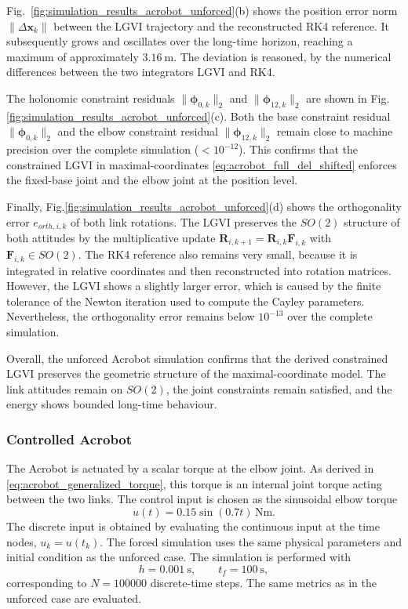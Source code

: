 Fig.~\ref{fig:simulation_results_acrobot_unforced}(b) shows the position error norm
$\|\Delta \bm{x}_k\|$ between the LGVI trajectory and the reconstructed RK4
reference. It subsequently grows and oscillates over the long-time
horizon, reaching a maximum of approximately $\SI{3.16}{\meter}$. The deviation is reasoned, by
the numerical differences between the two
integrators LGVI and RK4.

The holonomic constraint residuals $\|\bm{\phi}_{0,k}\|_2$ and $\|\bm{\phi}_{12,k}\|_2$ are shown in Fig.\ref{fig:simulation_results_acrobot_unforced}(c). Both the base constraint residual $\|\bm{\phi}_{0,k}\|_2$ and the elbow constraint residual $\|\bm{\phi}_{12,k}\|_2$ remain close to machine precision over the complete simulation ($< 10^{-12}$). This confirms that the constrained LGVI in maximal-coordinates \eqref{eq:acrobot_full_del_shifted} enforces the fixed-base joint and the elbow joint at the position level.

Finally, Fig.\ref{fig:simulation_results_acrobot_unforced}(d) shows the orthogonality error $e_{orth,i,k}$ of both link rotations. The LGVI preserves the $SO(2)$ structure of both attitudes by the multiplicative update $\bm{R}_{i,k+1}=\bm{R}_{i,k}\bm{F}_{i,k}$ with $\bm{F}_{i,k}\in SO(2)$. The RK4 reference also remains very small, because it is integrated in relative coordinates and then reconstructed into rotation matrices. However, the LGVI shows a slightly larger error, which is caused by the finite tolerance of the Newton iteration used to compute the Cayley parameters. Nevertheless, the orthogonality error remains below $10^{-13}$ over the complete simulation.

Overall, the unforced Acrobot simulation confirms that the derived constrained LGVI preserves the geometric structure of the maximal-coordinate model. The link attitudes remain on $SO(2)$, the joint constraints remain satisfied, and the energy shows bounded long-time behaviour.

\subsubsection{Controlled Acrobot}

The Acrobot is actuated by a scalar torque at the elbow joint. As derived in \eqref{eq:acrobot_generalized_torque}, this torque is an internal joint torque acting between the two links.
The control input is chosen as the sinusoidal elbow torque
\[
u(t)=0.15\sin(0.7t)\,\si{\newton\meter}.
\]
The discrete input is obtained by evaluating the continuous input at the time nodes, $u_k=u(t_k)$. The forced simulation uses the same physical parameters and initial condition as the unforced case. The simulation is performed with
\[
h=\SI{0.001}{\second},
\qquad
t_f=\SI{100}{\second},
\]
corresponding to $N=100000$ discrete-time steps. The same metrics as in the unforced case are evaluated.

